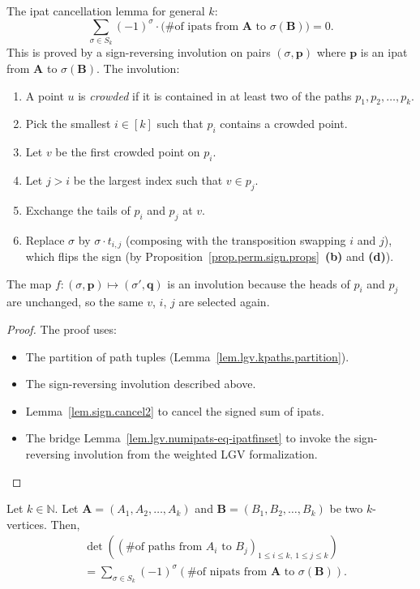 \begin{lemma}
\label{lem.lgv.kpaths.involution}
The ipat cancellation lemma for general $k$:
\[
  \sum_{\sigma \in S_k} (-1)^\sigma \cdot
  \bigl(\text{\# of ipats from } \mathbf{A} \text{ to }
  \sigma(\mathbf{B})\bigr) = 0.
\]
This is proved by a sign-reversing involution on pairs
$(\sigma, \mathbf{p})$ where $\mathbf{p}$ is an ipat from $\mathbf{A}$
to $\sigma(\mathbf{B})$. The involution:
\begin{enumerate}
\item A point $u$ is \emph{crowded} if it is contained in at least
  two of the paths $p_1, p_2, \ldots, p_k$.
\item Pick the smallest $i \in [k]$ such that $p_i$ contains a crowded
  point.
\item Let $v$ be the first crowded point on $p_i$.
\item Let $j > i$ be the largest index such that $v \in p_j$.
\item Exchange the tails of $p_i$ and $p_j$ at $v$.
\item Replace $\sigma$ by $\sigma \cdot t_{i,j}$ (composing with the
  transposition swapping $i$ and $j$), which flips the sign
  (by Proposition~\ref{prop.perm.sign.props}~\textbf{(b)} and
  \textbf{(d)}).
\end{enumerate}
The map $f : (\sigma, \mathbf{p}) \mapsto (\sigma', \mathbf{q})$ is
an involution because the heads of $p_i$ and $p_j$ are unchanged, so
the same $v$, $i$, $j$ are selected again.
\end{lemma}

\begin{proof}
The proof uses:
\begin{itemize}
\item The partition of path tuples (Lemma~\ref{lem.lgv.kpaths.partition}).
\item The sign-reversing involution described above.
\item Lemma~\ref{lem.sign.cancel2} to cancel the signed sum of ipats.
\item The bridge Lemma~\ref{lem.lgv.numipats-eq-ipatfinset} to invoke the
  sign-reversing involution from the weighted LGV formalization.
\end{itemize}
\end{proof}

\begin{proposition}
\label{prop.lgv.kpaths.count}
\leantarget
\leanok
Let
$k\in\mathbb{N}$. Let $\mathbf{A}=\left(  A_{1},A_{2},\ldots,A_{k}\right)  $
and $\mathbf{B}=\left(  B_{1},B_{2},\ldots,B_{k}\right)  $ be two
$k$-vertices. Then,
\begin{align*}
&  \det\left(  \left(  \text{\# of paths from }A_{i}\text{ to }B_{j}\right)
_{1\leq i\leq k,\ 1\leq j\leq k}\right) \\
&  =\sum_{\sigma\in S_{k}}\left(  -1\right)  ^{\sigma}\left(  \text{\# of
nipats from }\mathbf{A}\text{ to }\sigma\left(  \mathbf{B}\right)  \right)  .
\end{align*}
\end{proposition}

